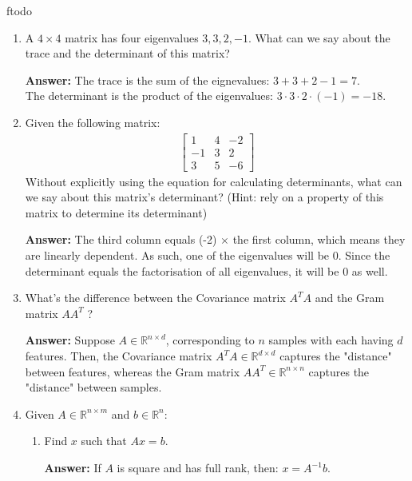 ƒtodo\documentclass{article}
\newenvironment{QandA}{\begin{enumerate}[label=\arabic*.]}{\end{enumerate}}
\newenvironment{InnerQandA}{\begin{enumerate}[label=\roman*.]}{\end{enumerate}}
\newenvironment{answer}{\par\normalfont \textbf{Answer:}}{}
\newcommand{\R}{\mathbb{R}}
\begin{document}
\begin{QandA}
    \item A $4 \times 4$ matrix has four eigenvalues $3,3,2,-1$. What can we say about the trace and the determinant of this matrix?
    \begin{answer}
        The trace is the sum of the eignevalues: $3+3+2-1 = 7$. \\
        The determinant is the product of the eigenvalues: $3 \cdot 3 \cdot 2 \cdot (-1) = -18$.
    \end{answer}
    
    \item Given the following matrix:
    \begin{align*}
        \begin{bmatrix}
        1 & 4 & -2 \\
        -1 & 3 & 2 \\
        3 & 5 & -6
    \end{bmatrix}
    \end{align*}
    Without explicitly using the equation for calculating determinants, what can we say about this matrix’s determinant? (Hint: rely on a property of this matrix to determine its determinant)
    \begin{answer}
        The third column equals (-2) $\times$ the first column, which means they are linearly dependent. As such, one of the eigenvalues will be 0. Since the determinant equals the factorisation of all eigenvalues, it will be 0 as well. 
    \end{answer}
    
    \item What’s the difference between the Covariance matrix  $A^TA$ and the Gram matrix $AA^T$ ?
    \begin{answer}
        Suppose $A \in \R^{n \times d}$, corresponding to $n$ samples with each having $d$ features. Then, the Covariance matrix $A^TA \in \R^{d \times d}$ captures the "distance" between features, whereas the Gram matrix $AA^T \in \R^{n \times n}$ captures the "distance" between samples.
    \end{answer}
    
    \item Given $A \in \R^{n \times m}$ and $b \in \R^n$:
    \begin{InnerQandA}
        \item Find $x$ such that $Ax = b$.
        \begin{answer}
            If $A$ is square and has full rank, then: $x = A^{-1}b$.
        \end{answer}
        

\end{InnerQandA}
\end{QandA}
\end{document}
